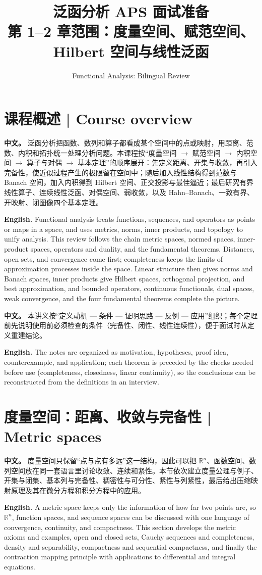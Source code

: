 \documentclass[UTF8,11pt,a4paper]{ctexart}
\title{泛函分析 APS 面试准备\\[4pt]\large 第 1--2 章范围：度量空间、赋范空间、Hilbert 空间与线性泛函}
\author{Functional Analysis: Bilingual Review}
\date{}
\newcommand{\APS}[2]{\par\noindent\textbf{中文。} #1\par\noindent\textbf{English.} #2\par\smallskip}
\begin{document}
\maketitle

\section*{课程概述 | Course overview}
\APS{泛函分析把函数、数列和算子都看成某个空间中的点或映射，用距离、范数、内积和拓扑统一处理分析问题。本课程按“度量空间 $\to$ 赋范空间 $\to$ 内积空间 $\to$ 算子与对偶 $\to$ 基本定理”的顺序展开：先定义距离、开集与收敛，再引入完备性，使近似过程产生的极限留在空间中；随后加入线性结构得到范数与 Banach 空间，加入内积得到 Hilbert 空间、正交投影与最佳逼近；最后研究有界线性算子、连续线性泛函、对偶空间、弱收敛，以及 Hahn--Banach、一致有界、开映射、闭图像四个基本定理。}{Functional analysis treats functions, sequences, and operators as points or maps in a space, and uses metrics, norms, inner products, and topology to unify analysis. This review follows the chain metric spaces, normed spaces, inner-product spaces, operators and duality, and the fundamental theorems. Distances, open sets, and convergence come first; completeness keeps the limits of approximation processes inside the space. Linear structure then gives norms and Banach spaces, inner products give Hilbert spaces, orthogonal projection, and best approximation, and bounded operators, continuous functionals, dual spaces, weak convergence, and the four fundamental theorems complete the picture.}

\APS{本讲义按“定义动机 — 条件 — 证明思路 — 反例 — 应用”组织；每个定理前先说明使用前必须检查的条件（完备性、闭性、线性连续性），便于面试时从定义重建结论。}{The notes are organized as motivation, hypotheses, proof idea, counterexample, and application; each theorem is preceded by the checks needed before use (completeness, closedness, linear continuity), so the conclusions can be reconstructed from the definitions in an interview.}

\section{度量空间：距离、收敛与完备性 | Metric spaces}
\APS{度量空间只保留“点与点有多远”这一结构，因此可以把 $\mathbb R^n$、函数空间、数列空间放在同一套语言里讨论收敛、连续和紧性。本节依次建立度量公理与例子、开集与闭集、基本列与完备性、稠密性与可分性、紧性与列紧性，最后给出压缩映射原理及其在微分方程和积分方程中的应用。}{A metric space keeps only the information of how far two points are, so $\mathbb R^n$, function spaces, and sequence spaces can be discussed with one language of convergence, continuity, and compactness. This section develops the metric axioms and examples, open and closed sets, Cauchy sequences and completeness, density and separability, compactness and sequential compactness, and finally the contraction mapping principle with applications to differential and integral equations.}
\end{document}
